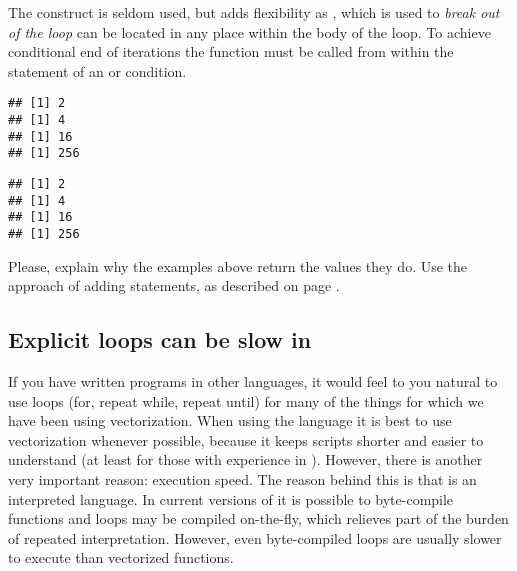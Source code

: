 \documentclass[krantz2]{krantz}\usepackage{knitr}%
\begin{document}
The  construct is seldom used, but adds flexibility as , which is used to \emph{break out of the loop} can be located in any place within the body of the loop. To achieve conditional end of iterations the  function must be called from within the statement of an  or  condition.

\begin{knitrout}\footnotesize
{}\color{fgcolor}\begin{kframe}
\begin{alltt}
 \hlkwb{<-} 
\hlstd{\{}
   \hlkwb{<-} \hlopt{^}
    \hlopt{>} \hlstd{) \{} \hlstd{()\}}
\hlstd{\}}
\end{alltt}
\begin{verbatim}
## [1] 2
## [1] 4
## [1] 16
## [1] 256
\end{verbatim}
\begin{alltt}
 \hlkwb{<-} 
\hlstd{\{}
    \hlopt{>} \hlstd{)} \hlstd{()}
   \hlkwb{<-} \hlopt{^}
\hlstd{\}}
\end{alltt}
\begin{verbatim}
## [1] 2
## [1] 4
## [1] 16
## [1] 256
\end{verbatim}
\end{kframe}
\end{knitrout}

\begin{playground}
Please, explain why the examples above return the values they do. Use the approach of adding  statements, as described on page \pageref{box:play:forloop}.
\end{playground}

\subsection{Explicit loops can be slow in \Rlang}\label{sec:loops:slow}
If you have written programs in other languages, it would feel to you natural to use loops (for, repeat while, repeat until) for many of the things for which we have been using vectorization. When using the \Rlang language it is best to use vectorization whenever possible, because it keeps scripts shorter and easier to understand (at least for those with experience in \Rlang). However, there is another very important reason: execution speed. The reason behind this is that \Rlang is an interpreted language. In current versions of \Rpgrm it is possible to byte-compile functions and loops may be compiled on-the-fly, which relieves part of the burden of repeated interpretation. However, even byte-compiled loops are usually slower to execute than vectorized functions.
\end{document}
